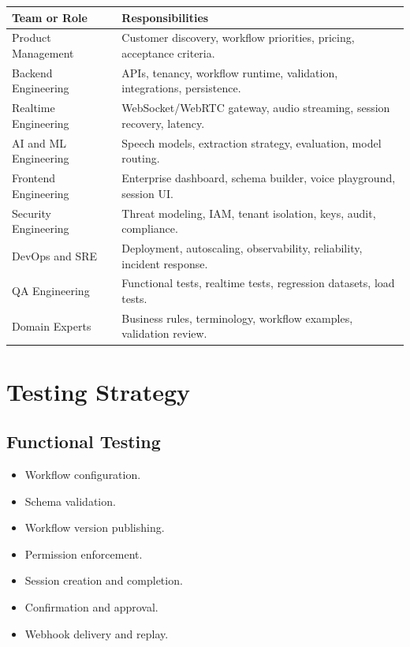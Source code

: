 \documentclass[11pt,a4paper]{article}
\begin{document}
\begin{tabularx}{\textwidth}{L{42mm}Y}
\toprule
\textbf{Team or Role} & \textbf{Responsibilities} \\
\midrule
Product Management
& Customer discovery, workflow priorities, pricing, acceptance criteria. \\

Backend Engineering
& APIs, tenancy, workflow runtime, validation, integrations, persistence. \\

Realtime Engineering
& WebSocket/WebRTC gateway, audio streaming, session recovery, latency. \\

AI and ML Engineering
& Speech models, extraction strategy, evaluation, model routing. \\

Frontend Engineering
& Enterprise dashboard, schema builder, voice playground, session UI. \\

Security Engineering
& Threat modeling, IAM, tenant isolation, keys, audit, compliance. \\

DevOps and SRE
& Deployment, autoscaling, observability, reliability, incident response. \\

QA Engineering
& Functional tests, realtime tests, regression datasets, load tests. \\

Domain Experts
& Business rules, terminology, workflow examples, validation review. \\
\bottomrule
\end{tabularx}

\section{Testing Strategy}

\subsection{Functional Testing}

\begin{itemize}
\item Workflow configuration.
\item Schema validation.
\item Workflow version publishing.
\item Permission enforcement.
\item Session creation and completion.
\item Confirmation and approval.
\item Webhook delivery and replay.
\end{itemize}
\end{document}
